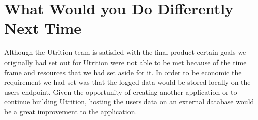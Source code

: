 \documentclass{article}
\begin{document}
\section{What Would you Do Differently Next Time}

Although the Utrition team is satisfied with the final product certain goals we originally had set out for Utrition were not able to be met because of the time frame and resources that we had set aside for it. In order to be economic the requirement we had set was that the logged data would be stored locally on the users endpoint. Given the opportunity of creating another application or to continue building Utrition, hosting the users data on an external database would be a great improvement to the application.
\end{document}
